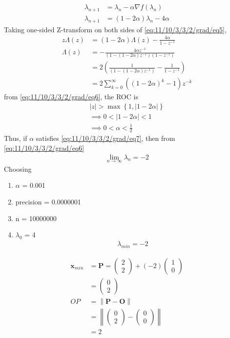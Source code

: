 \documentclass[12pt]{article}
\providecommand{\brak}[1]{\ensuremath{\left(#1\right)}}
\providecommand{\cbrak}[1]{\ensuremath{\left\{#1\right\}}}
\providecommand{\norm}[1]{\left\lVert#1\right\rVert}
\providecommand{\abs}[1]{\left\vert#1\right\vert}
\newcommand{\myvec}[1]{\ensuremath{\begin{pmatrix}#1\end{pmatrix}}}
\let\vec\mathbf
\begin{document}
\begin{align}
	\lambda_{n+1} &= \lambda_n - \alpha\nabla f\brak{\lambda_n}\\
	\label{eq:11/10/3/3/2/grad/eq5}
	\lambda_{n+1} &= \brak{1-2\alpha}\lambda_{n} - 4\alpha
\end{align}
Taking one-sided Z-transform on both sides of \eqref{eq:11/10/3/3/2/grad/eq5},
\begin{align}
	z\Lambda\brak{z} &= \brak{1-2\alpha}\Lambda\brak{z} - \frac{4\alpha}{1-z^{-1}}\\
	\Lambda\brak{z} &= -\frac{4\alpha z^{-1}}{\brak{1-\brak{1-2\alpha}z^{-1}}\brak{1-z^{-1}}}\\
	&= 2\brak{\frac{1}{\brak{1-\brak{1-2\alpha}z^{-1}}}-\frac{1}{1-z^{-1}}}\\
	\label{eq:11/10/3/3/2/grad/eq6}
	&= 2\sum_{k=0}^{\infty}\brak{\brak{1-2\alpha}^{k}-1}z^{-k}
\end{align}
from \eqref{eq:11/10/3/3/2/grad/eq6}, the ROC is
\begin{align}
	\abs{z}>\max\cbrak{{1,\abs{1-2\alpha}}}\\
	\implies 0<\abs{1-2\alpha}<1\\
	\label{eq:11/10/3/3/2/grad/eq7}
	\implies 0<\alpha<\frac{1}{2}
\end{align}
Thus, if $\alpha$ satisfies \eqref{eq:11/10/3/3/2/grad/eq7}, then from \eqref{eq:11/10/3/3/2/grad/eq6}
\begin{align}
	\lim_{n\to\infty} \lambda_{n} = -2
\end{align}
Choosing
\begin{enumerate}
\item $\alpha$ = 0.001
\item precision = 0.0000001
\item n = 10000000
\item $\lambda_0$ = 4
\begin{align}
	\lambda_{min} = -2
\end{align}
\end{enumerate}
\begin{align}
	\vec{x}_{min} &= \vec{P} = \myvec{2\\2}+\brak{-2}\myvec{1\\0}\\
	&= \myvec{0\\2}\\
	OP &= \norm{\vec{P}-\vec{O}}\\
	&= \norm{\myvec{0\\2}-\myvec{0\\0}}\\
	&= 2
\end{align}
\end{document}
